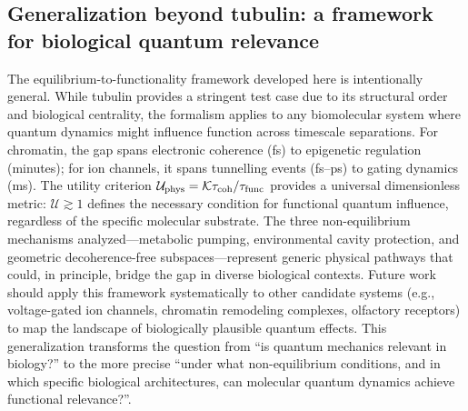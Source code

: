 \documentclass[twocolumn,10pt]{article}
\begin{document}


\subsection{Generalization beyond tubulin: a framework for biological quantum relevance}
The equilibrium-to-functionality framework developed here is intentionally
general. While tubulin provides a stringent test case due to its structural
order and biological centrality, the formalism applies to any biomolecular
system where quantum dynamics might influence function across timescale
separations. For chromatin, the gap spans electronic coherence (fs) to
epigenetic regulation (minutes); for ion channels, it spans tunnelling
events (fs--ps) to gating dynamics (ms). The utility criterion
$\mathcal{U}_{\rm phys} = \mathcal{K}\tau_{\text{coh}}/\tau_{\text{func}}$ provides
a universal dimensionless metric: $\mathcal{U}\gtrsim 1$ defines the
necessary condition for functional quantum influence, regardless of the
specific molecular substrate. The three non-equilibrium mechanisms
analyzed---metabolic pumping, environmental cavity protection, and
geometric decoherence-free subspaces---represent generic physical pathways
that could, in principle, bridge the gap in diverse biological contexts.
Future work should apply this framework systematically to other candidate
systems (e.g., voltage-gated ion channels, chromatin remodeling complexes,
olfactory receptors) to map the landscape of biologically plausible quantum
effects. This generalization transforms the question from ``is quantum
mechanics relevant in biology?'' to the more precise ``under what
non-equilibrium conditions, and in which specific biological architectures,
can molecular quantum dynamics achieve functional relevance?''.
\end{document}
